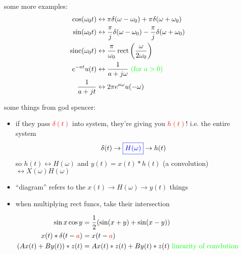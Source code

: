 \documentclass[a5paper, fleqn]{article}
\newcommand{\emf}[1]{\textcolor{red}{#1}}
\newcommand{\note}[1]{\textcolor{green}{#1}}
\newcommand{\eq}[1]{\textcolor{red}{$#1$}}
\DeclareMathOperator{\sinc}{sinc}
\DeclareMathOperator{\rect}{rect}
\begin{document}
some more examples:
\begin{align*}
  \cos(\omega_0 t)  & \leftrightarrow \pi \delta(\omega - \omega_0) + \pi \delta(\omega + \omega_0)                     \\
  \sin(\omega_0 t)  & \leftrightarrow \frac{\pi}{j} \delta(\omega - \omega_0) - \frac{\pi}{j} \delta(\omega + \omega_0) \\
  \sinc(\omega_0 t) & \leftrightarrow \frac{\pi}{\omega_0} \rect\left(\frac{\omega}{2\omega_0}\right)                   \\
  e^{-at} u(t)      & \leftrightarrow \frac{1}{a + j\omega} ~ \note{\text{(for $a > 0$)}}                               \\
  \frac{1}{a + jt}  & \leftrightarrow 2\pi e^{a\omega} u(-\omega)
\end{align*}

some things from god spencer:
\begin{itemize}
  \item if they pass \eq{\delta(t)} into system, they're giving you \eq{h(t)}! i.e. the entire system
        \[\delta(t) \to \textcolor{blue}{\boxed{H(\omega)}} \to h(t)\]
        so $h(t) \leftrightarrow H(\omega)$ and $y(t) = x(t) * h(t)$ (a convolution) $\leftrightarrow X(\omega)H(\omega)$
  \item ``diagram'' refers to the $x(t) \to \boxed{H(\omega)} \to y(t)$ things
  \item when multiplying rect funcs, take their intersection
\end{itemize}
\begin{align*}
  \sin x \cos y              & = \frac{1}{2}(\sin(x + y) + \sin(x - y))                              \\
  x(t) * \delta(t - \emf{a}) & = x(t - \emf{a})                                                      \\
  (Ax(t) + By(t)) * z(t)     & = Ax(t) * z(t) + By(t) * z(t) ~ \note{\text{linearity of convlution}}
\end{align*}
\end{document}
